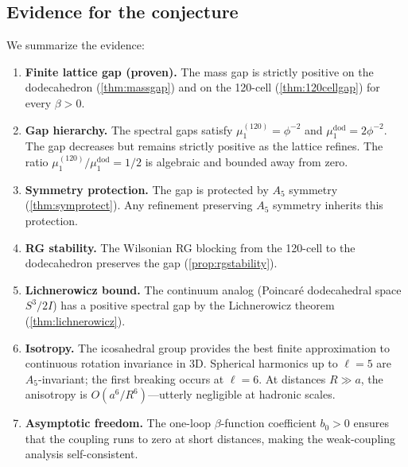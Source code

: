 \documentclass[12pt,a4paper]{article}
\theoremstyle{definition}
\theoremstyle{remark}
\newcommand{\ph}{\phi}
\begin{document}
\subsection{Evidence for the conjecture}\label{ssec:evidence}

We summarize the evidence:

\begin{enumerate}[label=\textbf{E\arabic*.}, leftmargin=2em]

\item \textbf{Finite lattice gap (proven).}
The mass gap is strictly positive on the dodecahedron (\cref{thm:massgap})
and on the 120-cell (\cref{thm:120cellgap}) for every $\beta > 0$.

\item \textbf{Gap hierarchy.}
The spectral gaps satisfy
$\mu_1^{(120)} = \ph^{-2}$ and $\mu_1^{\mathrm{dod}} = 2\ph^{-2}$.
The gap decreases but remains strictly positive as the lattice refines.
The ratio $\mu_1^{(120)}/\mu_1^{\mathrm{dod}} = 1/2$ is algebraic and
bounded away from zero.

\item \textbf{Symmetry protection.}
The gap is protected by $A_5$ symmetry (\cref{thm:symprotect}).
Any refinement preserving $A_5$ symmetry inherits this protection.

\item \textbf{RG stability.}
The Wilsonian RG blocking from the 120-cell to the dodecahedron preserves
the gap (\cref{prop:rgstability}).

\item \textbf{Lichnerowicz bound.}
The continuum analog (Poincar\'{e} dodecahedral space $S^3/2I$) has a
positive spectral gap by the Lichnerowicz theorem (\cref{thm:lichnerowicz}).

\item \textbf{Isotropy.}
The icosahedral group provides the best finite approximation to continuous
rotation invariance in 3D.  Spherical harmonics up to $\ell = 5$ are
$A_5$-invariant; the first breaking occurs at $\ell = 6$.  At distances
$R \gg a$, the anisotropy is $O(a^6/R^6)$---utterly negligible at
hadronic scales.

\item \textbf{Asymptotic freedom.}
The one-loop $\beta$-function coefficient $b_0 > 0$ ensures that the
coupling runs to zero at short distances, making the weak-coupling analysis
self-consistent.

\end{enumerate}
\end{document}

